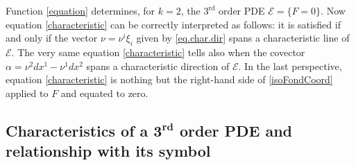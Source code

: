 \documentclass[pdftex]{sigma}
\newcommand{\E}{\mathcal{E}}
\newcommand{\Rd}{^\textrm{rd}}
\newcommand{\w}{\nu}
\numberwithin{equation}{section}
\begin{document}
\begin{Example}\label{exCharCoord}
Function \eqref{equation} determines, for $k=2$, the $3\Rd$ order PDE $\E=\{F=0\}$. Now equation \eqref{characteristic} can be correctly interpreted as follows: it is satisf\/ied if and only if the vector $\w=\w^i\xi_i$ given by \eqref{eq.char.dir} spans a characteristic line of $\E$. The very same equation \eqref{characteristic} tells also when the covector $\alpha=\w^2dx^1-\w^1dx^2$ spans a characteristic direction of $\E$. In the last perspective, equation \eqref{characteristic} is nothing but the right-hand side of \eqref{isoFondCoord} applied to $F$ and equated to zero.
\end{Example}

\subsection[Characteristics of a $3\Rd$ order PDE and relationship with its symbol]{Characteristics of a $\boldsymbol{3\Rd}$ order PDE and relationship with its symbol}\label{subsubDefPDE}
\end{document}
